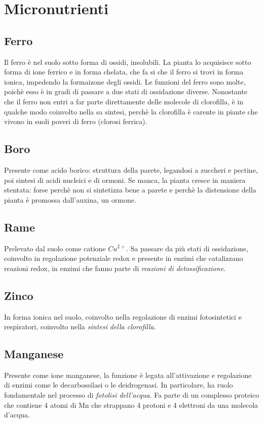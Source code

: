 \documentclass[a4paper,12pt]{book}
\begin{document}
\section{Micronutrienti}

\subsection{Ferro}
Il ferro è nel suolo sotto forma di ossidi, insolubili. La pianta lo acquisisce sotto forma di ione ferrico e in forma chelata, che fa si che il ferro si trovi in forma ionica, impedendo la formaizone degli ossidi.
Le funzioni del ferro sono molte, poichè esso è in gradi di passare a due stati di ossidazione diverse. Nonostante che il ferro non entri a far parte direttamente delle molecole di clorofilla, è in qualche modo coinvolto nella sa sintesi, perchè la clorofilla è carente in piante che vivono in suoli poveri di ferro (clorosi ferrica).

\subsection{Boro}
Presente come acido borico: struttura della parete, legandosi a zuccheri e pectine, poi sintesi di acidi nucleici e di ormoni. Se manca, la pianta cresce in maniera stentata: forse perchè non si sintetizza bene a parete e perchè la distensione della pianta è promossa dall'auxina, un ormone.

\subsection{Rame}
Prelevato dal suolo come catione $Cu^{2+}$. Sa passare da più stati di ossidazione, coinvolto in regolazione potenziale redox e presente in enzimi che catalizzano reazioni redox, in enzimi che fanno parte di \emph{reazioni di detossificazione}.

\subsection{Zinco}
In forma ionica nel suolo, coinvolto nella regolazione di enzimi fotosintetici e respiratori, coinvolto nella \emph{sintesi della clorofilla}.

\subsection{Manganese}
Presente come ione manganese, la funzione è legata all'attivazione e regolazione di enzimi come le decarbossilasi o le deidrogenasi. In particolare, ha ruolo fondamentale nel processo di \emph{fotolisi dell'acqua}.
Fa parte di un complesso proteico che contiene 4 atomi di Mn che strappano 4 protoni e 4 elettroni da una molecola d'acqua.
\end{document}
